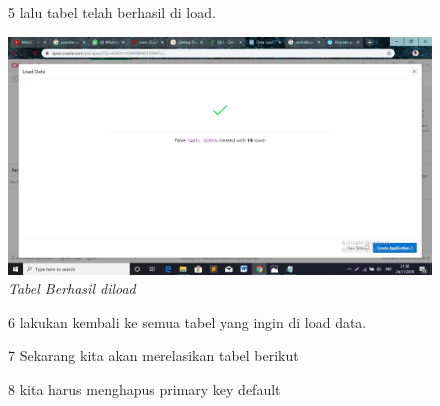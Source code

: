 \begin{enumerate}
\begin{figure}
\item[5]lalu tabel telah berhasil di load.
    \begin{center}
\includegraphics[scale=0.4]{apex/ss12.png}
    \caption{\textit{Tabel Berhasil diload}}
        \end{center}
\label{gambar}
\end{figure}

\begin{figure}
\item[6]lakukan kembali ke semua tabel yang ingin di load data.
\end{figure}

\begin{figure}
\item[7]Sekarang kita akan merelasikan tabel berikut
\end{figure}

\begin{figure}
\item[8]kita harus menghapus primary key default
\end{figure}


\end{enumerate}

